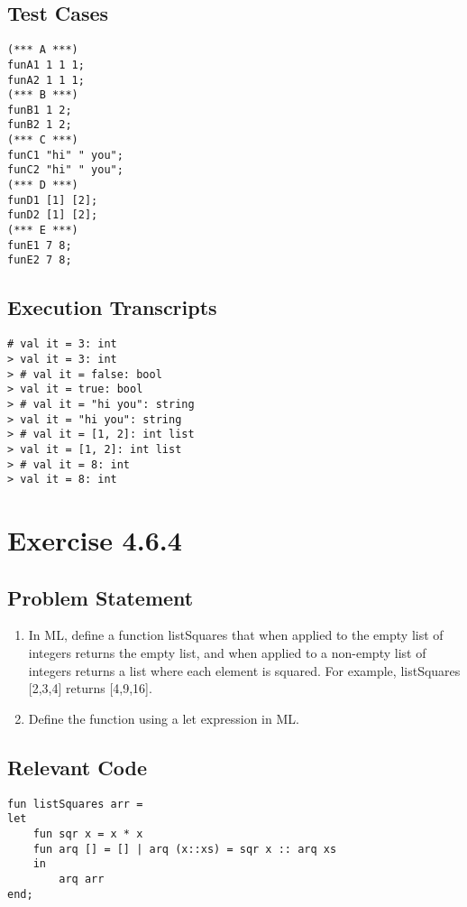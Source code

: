 \documentclass[twoside]{report}
\begin{document}
\section{Test Cases}
    \begin{scriptsize}
    \begin{verbatim}
(*** A ***)
funA1 1 1 1;
funA2 1 1 1;
(*** B ***)
funB1 1 2;
funB2 1 2;
(*** C ***)
funC1 "hi" " you";
funC2 "hi" " you";
(*** D ***)
funD1 [1] [2];
funD2 [1] [2];
(*** E ***)
funE1 7 8;
funE2 7 8;
    \end{verbatim}
    \end{scriptsize}
\section{Execution Transcripts}
\begin{scriptsize}
    \begin{verbatim}
# val it = 3: int
> val it = 3: int
> # val it = false: bool
> val it = true: bool
> # val it = "hi you": string
> val it = "hi you": string
> # val it = [1, 2]: int list
> val it = [1, 2]: int list
> # val it = 8: int
> val it = 8: int
    \end{verbatim}
\end{scriptsize}
    
\chapter{Exercise 4.6.4}
\label{cha:4-6-4}
\section{Problem Statement}
\begin{enumerate}
    \item In ML, define a function listSquares that when applied to the empty list of integers returns the empty list, and when applied to a non-empty list of integers returns a list where each element is squared. For example, listSquares [2,3,4] returns [4,9,16].
    \item Define the function using a let expression in ML.
\end{enumerate}
\section{Relevant Code}
\begin{scriptsize}
    \begin{verbatim}
fun listSquares arr =
let 
	fun sqr x = x * x
	fun arq [] = [] | arq (x::xs) = sqr x :: arq xs
    in
    	arq arr
end;
    \end{verbatim}
\end{scriptsize}
\end{document}
